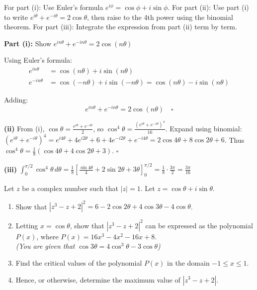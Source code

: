 \begin{hint}
For part (i): Use Euler's formula $e^{i\phi} = \cos\phi + i\sin\phi$. For part (ii): Use part (i) to write $e^{i\theta} + e^{-i\theta} = 2\cos\theta$, then raise to the 4th power using the binomial theorem. For part (iii): Integrate the expression from part (ii) term by term.
\end{hint}

\begin{solution}[Sketch]
\textbf{Part (i):} Show $e^{in\theta} + e^{-in\theta} = 2\cos(n\theta)$

Using Euler's formula:
\begin{align*}
e^{in\theta} &= \cos(n\theta) + i\sin(n\theta)\\
e^{-in\theta} &= \cos(-n\theta) + i\sin(-n\theta) = \cos(n\theta) - i\sin(n\theta)
\end{align*}

Adding:
\[
e^{in\theta} + e^{-in\theta} = 2\cos(n\theta) \quad \square
\]

\textbf{(ii)} From (i), $\cos\theta = \frac{e^{i\theta}+e^{-i\theta}}{2}$, so $\cos^4\theta = \frac{(e^{i\theta}+e^{-i\theta})^4}{16}$. Expand using binomial: $(e^{i\theta}+e^{-i\theta})^4 = e^{i4\theta}+4e^{i2\theta}+6+4e^{-i2\theta}+e^{-i4\theta} = 2\cos 4\theta+8\cos 2\theta+6$. Thus $\cos^4\theta = \frac{1}{8}(\cos 4\theta+4\cos 2\theta+3)$. \quad $\square$

\textbf{(iii)} $\displaystyle \int_0^{\pi/2} \cos^4\theta \, d\theta = \frac{1}{8}\left[\frac{\sin 4\theta}{4}+2\sin 2\theta+3\theta\right]_0^{\pi/2} = \frac{1}{8}\cdot\frac{3\pi}{2} = \boxed{\frac{3\pi}{16}}$
\end{solution}

\begin{problem}
Let $z$ be a complex number such that $|z| = 1$. Let $z = \cos\theta + i\sin\theta$.

\begin{enumerate}[label=(\roman*),leftmargin=*]
    \item Show that $|z^3 - z + 2|^2 = 6 - 2\cos2\theta + 4\cos3\theta - 4\cos\theta$.
    \item Letting $x = \cos\theta$, show that $|z^3 - z + 2|^2$ can be expressed as the polynomial $P(x)$, where $P(x) = 16x^3 - 4x^2 - 16x + 8$. \\
    \textit{(You are given that $\cos3\theta = 4\cos^3\theta - 3\cos\theta$)}
    \item Find the critical values of the polynomial $P(x)$ in the domain $-1 \le x \le 1$.
    \item Hence, or otherwise, determine the maximum value of $|z^3 - z + 2|$.
\end{enumerate}
\end{problem}

